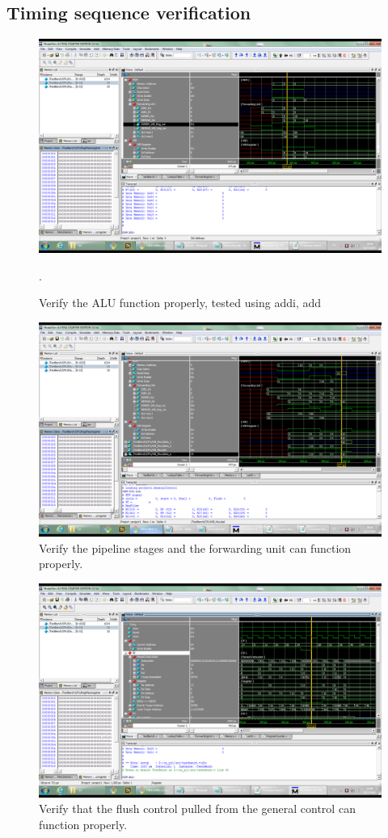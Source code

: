 \documentclass[11pt, a4paper]{article}
\begin{document}
\subsection{Timing sequence verification}
\begin{figure}[H]
\includegraphics[width=\textwidth]{addi}
\caption{Verify the ALU function properly, tested using {\sc addi}, {\sc add}}.
\end{figure}
\begin{figure}[H]
\includegraphics[width=\textwidth]{pipeline}
\caption{Verify the pipeline stages and the forwarding unit can function properly.}
\end{figure}
\begin{figure}[H]
\includegraphics[width=\textwidth]{flush}
\caption{Verify that the flush control pulled from the general control can function properly.}
\end{figure}
\end{document}
